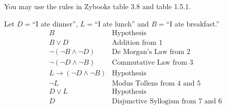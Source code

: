 \documentclass[11pt]{article}
\def\sectionOneA#1{}
\def\sectionTwoA#1{#1}
\newcounter{pgpts}
\newcounter{cumpts}
\newcommand{\cnewpage}{\addtocounter{cumpts}{\value{pgpts}}\newpage\setcounter{pgpts}{0}}
\begin{document}
You may use the rules in Zybooks table 3.8 and table 1.5.1.

\sectionOneA{
Let $S=$``I am smart'', $L=$``I am lucky,'' and $W=$``I will win the lottery.''
\begin{align}
    &\neg W &\text{Hypothesis}\\
    &\neg W \vee S &\text{Addition from $1$}\\
    &\neg(W \wedge \neg S) &\text{De Morgan's Law from $2$}\\
    &L\rightarrow(W \wedge \neg S) &\text{Hypothesis}\\
    &\neg L &\text{Modus Tollens from $3$ and $4$.}\\
    &S\vee L &\text{Hypothesis}\\
    &S &\text{Disjunctive Syllogism from 6 and 5}
\end{align}
}
\sectionTwoA{
Let $D=$``I ate dinner'', $L=$``I ate lunch'' and $B=$``I ate breakfast.''
\begin{align}
    &B &\text{Hypothesis}\\
    &B \vee D &\text{Addition from 1}\\
    &\neg (\neg B \wedge \neg D) &\text{De Morgan's Law from 2}\\
    &\neg (\neg D \wedge \neg B) &\text{Commutative Law from 3}\\
    &L \rightarrow (\neg D \wedge \neg B) &\text{Hypothesis}\\
    &\neg L &\text{Modus Tollens from 4 and 5}\\
    &D \vee L &\text{Hypothesis}\\
    &D &\text{Disjunctive Syllogism from 7 and 6}
\end{align}
}
\cnewpage



\end{document}
